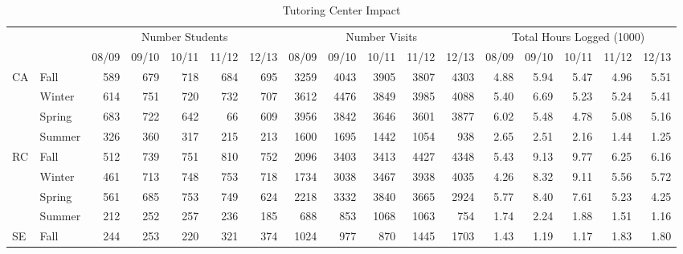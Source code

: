 \clearpage

\begin{sidewaystable}[!h]
	\centering
	\caption{Tutoring Center Impact}\label{app:tut:tab:SLC}
    \begin{tabular}{llrrrrrrrrrrrrrrr}
		\toprule
		&        &\multicolumn{5}{c}{Number Students}&\multicolumn{5}{c}{Number Visits}&\multicolumn{5}{c}{Total Hours Logged (1000)}\\
		                    &        & 08/09 & 09/10 & 10/11 & 11/12 & 12/13 & 08/09 & 09/10 & 10/11 & 11/12 & 12/13  & 08/09 & 09/10 & 10/11 & 11/12 & 12/13 \\
		\midrule
		\multirow{4}{*}{CA} & Fall   & 589   & 679   & 718   & 684   & 695   & 3259  & 4043  & 3905  & 3807 & 4303   & 4.88 & 5.94 & 5.47 & 4.96 & 5.51 \\
		                    & Winter & 614   & 751   & 720   & 732   & 707   & 3612  & 4476  & 3849  & 3985 & 4088   & 5.40 & 6.69 & 5.23 & 5.24 & 5.41 \\
		                    & Spring & 683   & 722   & 642   & 66    & 609   & 3956  & 3842  & 3646  & 3601 & 3877   & 6.02 & 5.48 & 4.78 & 5.08 & 5.16 \\
		                    & Summer & 326   & 360   & 317   & 215   & 213   & 1600  & 1695  & 1442  & 1054 & 938    & 2.65 & 2.51 & 2.16 & 1.44 & 1.25 \\
		\cmidrule{2-17}
		\multirow{4}{*}{RC} & Fall   & 512   & 739   & 751   & 810   & 752   & 2096  & 3403  & 3413  & 4427 & 4348   & 5.43 & 9.13 & 9.77 & 6.25 & 6.16 \\
		                    & Winter & 461   & 713   & 748   & 753   & 718   & 1734  & 3038  & 3467  & 3938 & 4035   & 4.26 & 8.32 & 9.11 & 5.56 & 5.72 \\
		                    & Spring & 561   & 685   & 753   & 749   & 624   & 2218  & 3332  & 3840  & 3665 & 2924   & 5.77 & 8.40 & 7.61 & 5.23 & 4.25 \\
		                    & Summer & 212   & 252   & 257   & 236   & 185   & 688   & 853   & 1068  & 1063 & 754    & 1.74 & 2.24 & 1.88 & 1.51 & 1.16 \\
		\cmidrule{2-17}
		\multirow{4}{*}{SE} & Fall   & 244   & 253   & 220   & 321   & 374   & 1024  & 977   & 870   & 1445 & 1703   & 1.43 & 1.19 & 1.17 & 1.83 & 1.80 \\

\end{tabular}
\end{sidewaystable}
